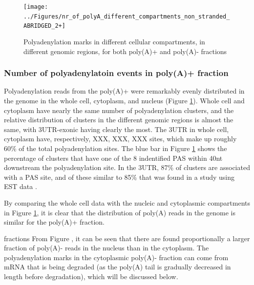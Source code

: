 \documentclass[a4paper]{article}
\begin{document}
\begin{figure}[h]
	\centering
		\texttt{[image: ../Figures/nr\_of\_polyA\_different\_compartments\_non\_stranded\_ABRIDGED\_2+]}
	\caption{Polyadenylation marks in different cellular compartments, in
	different genomic regions, for both poly(A)+ and poly(A)- fractions}
	\label{fig:region_counts}
\end{figure}
\subsubsection{Number of polyadenylatoin events in poly(A)+ fraction}
Polyadenylation reads from the poly(A)+ were remarkably evenly distributed in
the genome in the whole cell, cytoplasm, and nucleus (Figure
\ref{fig:region_counts}). Whole cell and cytoplasm have nearly the same number
of polyadenylation clusters, and the relative distribution of clusters in the
different genomic regions is almost the same, with 3UTR-exonic having clearly
the most. The 3UTR in whole cell, cytoplasm have, respectively, XXX, XXX, XXX
sites, which make up roughly 60\% of the total polyadenylation
sites. The blue bar in Figure \ref{fig:region_counts} shows the percentage of
clusters that have one of the 8 indentified PAS \cite{} within 40nt downstream
the polyadenylation site. In the 3UTR, 87\% of clusters are associated with a
PAS site, and of these similar to 85\% that was found in a study using EST data
\cite{}.


By comparing the whole cell data with the  nucleic
and cytoplasmic compartments in Figure \ref{fig:region_counts}, it is clear
that the distribution of poly(A) reads in the genome is similar for the
poly(A)+ fraction.


fractions From Figure , it can be seen that there are found
proportionally a larger fraction of poly(A)- reads in the nucleus than in the
cytoplasm. The polyadenylation marks in the cytoplasmic poly(A)- fraction can
come from mRNA that is being degraded (as the poly(A) tail is gradually
decreased in length before degradation), which will be discussed below.
\end{document}
